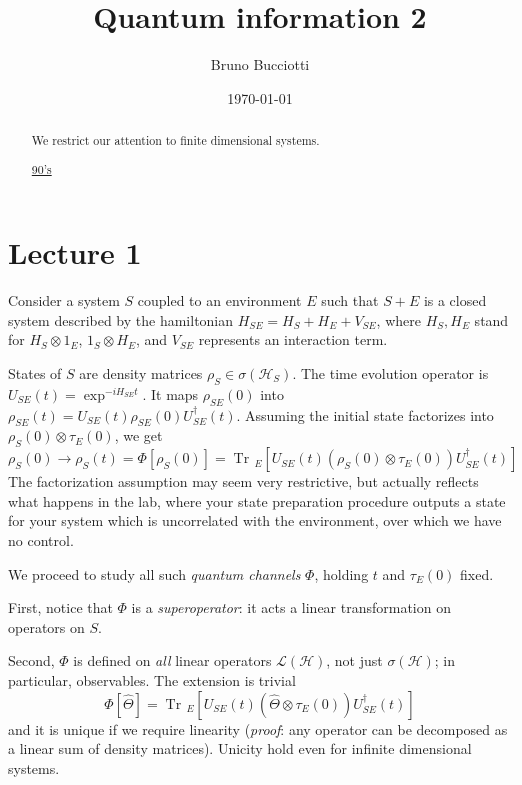 \documentclass[a4paper, 11pt]{article}
\date{\today}
\author{Bruno Bucciotti}
\title{Quantum information 2}
\newcommand{\Tr}{\mathop{\mathrm{Tr}\!}{}}
\newcommand{\HH}{\mathcal{H}}
\begin{document}
	\maketitle
	
	\begin{abstract}
		We restrict our attention to finite dimensional systems.
		
		\href{https://www.youtube.com/watch?v=GyKcdbFGeV8}{90's}
		
	\end{abstract}

	\tableofcontents
	\clearpage
	\section{Lecture 1}
	Consider a system $S$ coupled to an environment $E$ such that $S+E$ is a closed system described by the hamiltonian $H_{SE} = H_S + H_E + V_{SE}$, where $H_S,H_E$ stand for $H_S\otimes 1_E$, $1_S\otimes H_E$, and $V_{SE}$ represents an interaction term.
	
	States of $S$ are density matrices $\rho_S\in\sigma(\HH_S)$.
	The time evolution operator is $U_{SE}(t) = \exp^{-i H_{SE} t}$. It maps $\rho_{SE}(0)$ into $\rho_{SE}(t) = U_{SE}(t) \rho_{SE}(0) U^\dagger_{SE}(t)$. Assuming the initial state factorizes into $\rho_S(0)\otimes\tau_E(0)$, we get
	\[ \rho_S(0)\rightarrow \rho_S(t) = \Phi\left[\rho_S(0)\right] = \Tr_E\left[ U_{SE}(t) \left(\rho_S(0)\otimes\tau_E(0)\right) U^\dagger_{SE}(t) \right] \]
	The factorization assumption may seem very restrictive, but actually reflects what happens in the lab, where your state preparation procedure outputs a state for your system which is uncorrelated with the environment, over which we have no control.
	\vspace{5mm}
	
	We proceed to study all such \emph{quantum channels} $\Phi$, holding $t$ and $\tau_E(0)$ fixed.
	
	\noindent First, notice that $\Phi$ is a \emph{superoperator}: it acts a linear transformation on operators on $S$.
	
	\noindent Second, $\Phi$ is defined on \emph{all} linear operators $\mathcal{L}(\HH)$, not just $\sigma(\HH)$; in particular, observables. The extension is trivial
	\[ \Phi\left[\hat{\Theta}\right] = \Tr_E\left[ U_{SE}(t) \left(\hat{\Theta}\otimes\tau_E(0)\right) U^\dagger_{SE}(t) \right] \]
	and it is unique if we require linearity (\emph{proof}: any operator can be decomposed as a linear sum of density matrices). Unicity hold even for infinite dimensional systems.
	
\end{document}
